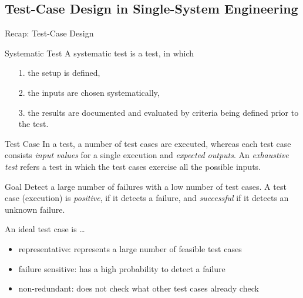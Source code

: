 \subsection{Test-Case Design in Single-System Engineering}
\begin{frame}{Recap: Test-Case Design }
	\begin{mycolumns}
		\begin{definition}{Systematic Test \mysource{\ludewiglichter}}
			A systematic test is a test, in which
			\begin{itemize}
				\setlength\itemsep{.1em}
				\item[1.] the setup is defined,
				\item[2.] the inputs are chosen systematically,
				\item[3.] the results are documented and evaluated by criteria being defined prior to the test. 
			\end{itemize}
		\end{definition}
		\pause
		\begin{definition}{Test Case \mysource{\ludewiglichter}}
			In a test, a number of test cases are executed, whereas each test case consists \emph{input values} for a single execution and \emph{expected outputs}. An \emph{exhaustive test} refers a test in which the test cases exercise all the possible inputs.
		\end{definition}
	\mynextcolumn
		\pause
		\begin{note}{Goal \mysource{\ludewiglichter}}
			Detect a large number of failures with a low number of test cases. A test case (execution) is \emph{positive}, if it detects a failure, and \emph{successful} if it detects an unknown failure.
		\end{note}
		\pause
		\begin{definition}{An ideal test case is \ldots \mysource{\ludewiglichter}}
			\begin{itemize}
				\setlength\itemsep{.1em}
				\item representative: represents a large number of feasible test cases
				\item failure sensitive: has a high probability to detect a failure
				\item non-redundant: does not check what other test cases already check
			\end{itemize}
		\end{definition}
	\end{mycolumns}
\end{frame}

